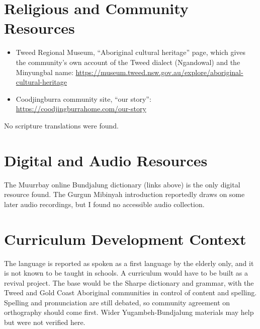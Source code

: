 \documentclass[12pt]{article}
\begin{document}
\section{Religious and Community Resources}
\begin{itemize}
\item Tweed Regional Museum, ``Aboriginal cultural heritage'' page, which gives the community's own account of the Tweed dialect (Ngandowal) and the Minyungbal name: \url{https://museum.tweed.nsw.gov.au/explore/aboriginal-cultural-heritage}
\item Coodjingburra community site, ``our story'': \url{https://coodjingburrahome.com/our-story}
\end{itemize}
No scripture translations were found.

\section{Digital and Audio Resources}
The Muurrbay online Bundjalung dictionary (links above) is the only digital resource found. The Gurgun Mibinyah introduction reportedly draws on some later audio recordings, but I found no accessible audio collection.

\section{Curriculum Development Context}
The language is reported as spoken as a first language by the elderly only, and it is not known to be taught in schools. A curriculum would have to be built as a revival project. The base would be the Sharpe dictionary and grammar, with the Tweed and Gold Coast Aboriginal communities in control of content and spelling. Spelling and pronunciation are still debated, so community agreement on orthography should come first. Wider Yugambeh-Bundjalung materials may help but were not verified here.
\end{document}
